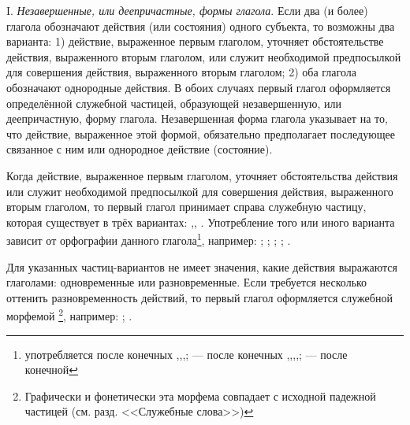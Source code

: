 I. \emph{Незавершенные, или деепричастные, формы глагола}. Если два (и более) глагола обозначают действия (или состояния) одного субъекта, то возможны два варианта: 1) действие, выраженное первым глаголом, уточняет обстоятельстве действия, выраженного вторым глаголом, или служит необходимой предпосылкой для совершения действия, выраженного вторым глаголом; 2) оба глагола обозначают однородные действия. В обоих случаях первый глагол оформляется определённой служебной частицей, образующей незавершенную, или деепричастную, форму глагола. Незавершенная форма глагола указывает на то, что действие, выраженное этой формой, обязательно предполагает последующее связанное с ним или однородное действие (состояние).

Когда действие, выраженное первым глаголом, уточняет обстоятельства действия или служит необходимой предпосылкой для совершения действия, выраженного вторым глаголом, то первый глагол принимает справа служебную частицу, которая существует в трёх вариантах: ,, . Употребление того или иного варианта зависит от орфографии данного глагола\footnote[36]{ употребляется после конечных ,,,;  --- после конечных ,,,,;  --- после конечной }, например:
;
;
;
;
.

Для указанных частиц-вариантов не имеет значения, какие действия выражаются глаголами: одновременные или разновременные. Если требуется несколько оттенить разновременность действий, то первый глагол оформляется служебной морфемой \footnote[37]{Графически и фонетически эта морфема совпадает с исходной падежной частицей (см. разд. <<Служебные слова>>)}, например:
;
.

